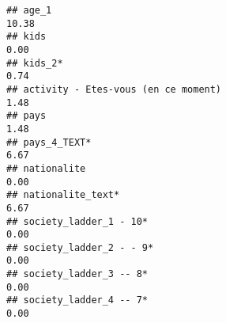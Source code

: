 \documentclass[
]{article}
\begin{document}
\begin{verbatim}
## age_1                                                                                                                                                                                                                       10.38
## kids                                                                                                                                                                                                                         0.00
## kids_2*                                                                                                                                                                                                                      0.74
## activity - Etes-vous (en ce moment)                                                                                                                                                                                          1.48
## pays                                                                                                                                                                                                                         1.48
## pays_4_TEXT*                                                                                                                                                                                                                 6.67
## nationalite                                                                                                                                                                                                                  0.00
## nationalite_text*                                                                                                                                                                                                            6.67
## society_ladder_1 - 10*                                                                                                                                                                                                       0.00
## society_ladder_2 - - 9*                                                                                                                                                                                                      0.00
## society_ladder_3 -- 8*                                                                                                                                                                                                       0.00
## society_ladder_4 -- 7*                                                                                                                                                                                                       0.00

\end{verbatim}
\end{document}

